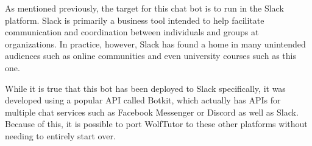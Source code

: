 As mentioned previously, the target for this chat bot is to run in the Slack
platform.  Slack is primarily a business tool intended to help facilitate
communication and coordination between individuals and groups at organizations.
In practice, however, Slack has found a home in many unintended audiences such
as online communities and even university courses such as this one.  

While it is true that this bot has been deployed to Slack specifically, it was
developed using a popular API called Botkit, which actually has APIs for
multiple chat services such as Facebook Messenger or Discord as well as Slack.
Because of this, it is possible to port WolfTutor to these other platforms
without needing to entirely start over.

